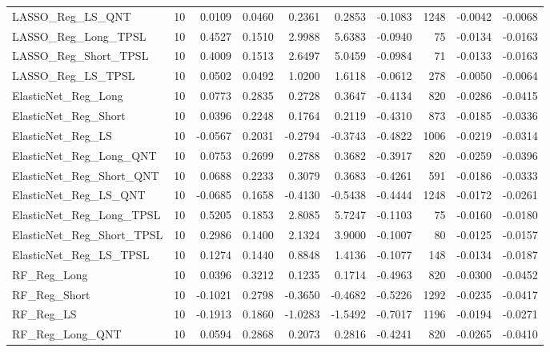 \begin{tabular}{llrrrrrrrr}
\cline{1-10}
LASSO\_Reg\_LS\_QNT & 10 & 0.0109 & 0.0460 & 0.2361 & 0.2853 & -0.1083 & 1248 & -0.0042 & -0.0068 \\
\cline{1-10}
LASSO\_Reg\_Long\_TPSL & 10 & 0.4527 & 0.1510 & 2.9988 & 5.6383 & -0.0940 & 75 & -0.0134 & -0.0163 \\
\cline{1-10}
LASSO\_Reg\_Short\_TPSL & 10 & 0.4009 & 0.1513 & 2.6497 & 5.0459 & -0.0984 & 71 & -0.0133 & -0.0163 \\
\cline{1-10}
LASSO\_Reg\_LS\_TPSL & 10 & 0.0502 & 0.0492 & 1.0200 & 1.6118 & -0.0612 & 278 & -0.0050 & -0.0064 \\
\cline{1-10}
ElasticNet\_Reg\_Long & 10 & 0.0773 & 0.2835 & 0.2728 & 0.3647 & -0.4134 & 820 & -0.0286 & -0.0415 \\
\cline{1-10}
ElasticNet\_Reg\_Short & 10 & 0.0396 & 0.2248 & 0.1764 & 0.2119 & -0.4310 & 873 & -0.0185 & -0.0336 \\
\cline{1-10}
ElasticNet\_Reg\_LS & 10 & -0.0567 & 0.2031 & -0.2794 & -0.3743 & -0.4822 & 1006 & -0.0219 & -0.0314 \\
\cline{1-10}
ElasticNet\_Reg\_Long\_QNT & 10 & 0.0753 & 0.2699 & 0.2788 & 0.3682 & -0.3917 & 820 & -0.0259 & -0.0396 \\
\cline{1-10}
ElasticNet\_Reg\_Short\_QNT & 10 & 0.0688 & 0.2233 & 0.3079 & 0.3683 & -0.4261 & 591 & -0.0186 & -0.0333 \\
\cline{1-10}
ElasticNet\_Reg\_LS\_QNT & 10 & -0.0685 & 0.1658 & -0.4130 & -0.5438 & -0.4444 & 1248 & -0.0172 & -0.0261 \\
\cline{1-10}
ElasticNet\_Reg\_Long\_TPSL & 10 & 0.5205 & 0.1853 & 2.8085 & 5.7247 & -0.1103 & 75 & -0.0160 & -0.0180 \\
\cline{1-10}
ElasticNet\_Reg\_Short\_TPSL & 10 & 0.2986 & 0.1400 & 2.1324 & 3.9000 & -0.1007 & 80 & -0.0125 & -0.0157 \\
\cline{1-10}
ElasticNet\_Reg\_LS\_TPSL & 10 & 0.1274 & 0.1440 & 0.8848 & 1.4136 & -0.1077 & 148 & -0.0134 & -0.0187 \\
\cline{1-10}
RF\_Reg\_Long & 10 & 0.0396 & 0.3212 & 0.1235 & 0.1714 & -0.4963 & 820 & -0.0300 & -0.0452 \\
\cline{1-10}
RF\_Reg\_Short & 10 & -0.1021 & 0.2798 & -0.3650 & -0.4682 & -0.5226 & 1292 & -0.0235 & -0.0417 \\
\cline{1-10}
RF\_Reg\_LS & 10 & -0.1913 & 0.1860 & -1.0283 & -1.5492 & -0.7017 & 1196 & -0.0194 & -0.0271 \\
\cline{1-10}
RF\_Reg\_Long\_QNT & 10 & 0.0594 & 0.2868 & 0.2073 & 0.2816 & -0.4241 & 820 & -0.0265 & -0.0410 \\

\end{tabular}
